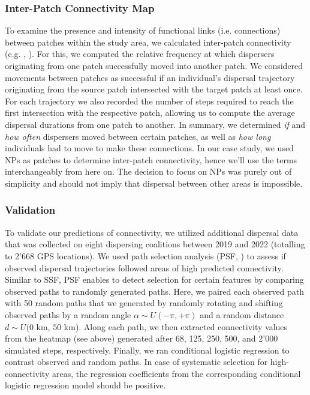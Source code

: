 \documentclass[abstract=on,10pt,a4paper,bibliography=totocnumbered]{article}
\begin{document}
\subsubsection{Inter-Patch Connectivity Map}
To examine the presence and intensity of functional links (i.e. connections)
between patches within the study area, we calculated inter-patch connectivity
(e.g. \citealp{Gustafson.1996}, \citealp{Kanagaraj.2013}). For this, we computed
the relative frequency at which dispersers originating from one patch
successfully moved into another patch. We considered movements between patches
as successful if an individual's dispersal trajectory originating from the
source patch intersected with the target patch at least once. For each
trajectory we also recorded the number of steps required to reach the first
intersection with the respective patch, allowing us to compute the average
dispersal durations from one patch to another. In summary, we determined
\textit{if} and \textit{how often} dispersers moved between certain patches, as
well as \textit{how long} individuals had to move to make these connections. In
our case study, we used NPs as patches to determine inter-patch connectivity,
hence we'll use the terms interchangeably from here on. The decision to focus on
NPs was purely out of simplicity and should not imply that dispersal between
other areas is impossible.

\subsubsection{Validation}
To validate our predictions of connectivity, we utilized additional dispersal
data that was collected on eight dispersing coalitions between 2019 and 2022
(totalling to 2'668 GPS locations). We used path selection analysis (PSF,
\citealp{Cushman.2010}) to assess if observed dispersal trajectories followed
areas of high predicted connectivity. Similar to SSF, PSF enables to detect
selection for certain features by comparing observed paths to randomly generated
paths. Here, we paired each observed path with 50 random paths that we generated
by randomly rotating and shifting observed paths by a random angle \(\alpha \sim
U(-\pi, +\pi)\) and a random distance \(d \sim U(0 \) km, \(50\) km\(\)). Along
each path, we then extracted connectivity values from the heatmap (see above)
generated after 68, 125, 250, 500, and 2'000 simulated steps, respectively.
Finally, we ran conditional logistic regression to contrast observed and random
paths. In case of systematic selection for high-connectivity areas, the
regression coefficients from the corresponding conditional logistic regression
model should be positive.
\end{document}
